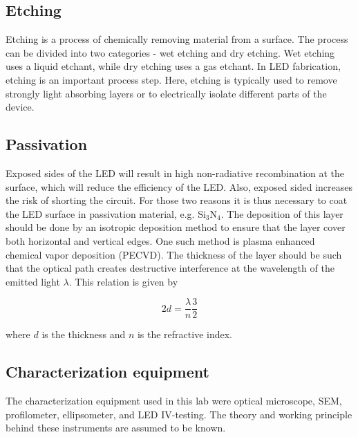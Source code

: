 \subsection{Etching}
\label{etching}

Etching is a process of chemically removing material from a surface. 
The process can be divided into two categories -  wet etching and dry etching.
Wet etching uses a liquid etchant, while dry etching uses a gas etchant.
In LED fabrication, etching is an important process step.
Here, etching is typically used to remove strongly light absorbing layers or to electrically isolate different parts of the device.

\subsection{Passivation}

Exposed sides of the LED will result in high non-radiative recombination at the surface, which will reduce the efficiency of the LED.
Also, exposed sided increases the risk of shorting the circuit.
For those two reasons it is thus necessary to coat the LED surface in passivation material, e.g. Si$_3$N$_4$.
The deposition of this layer should be done by an isotropic deposition method to ensure that the layer cover both horizontal and vertical edges.
One such method is plasma enhanced chemical vapor deposition (PECVD).
The thickness of the layer should be such that the optical path creates destructive interference at the wavelength of the emitted light $\lambda$.
This relation is given by

\begin{equation}
    \label{eq:thickness}
    2d = \frac{\lambda}{n} \frac{3}{2}
\end{equation}

where $d$ is the thickness and $n$ is the refractive index.

\subsection{Characterization equipment}
\label{characterization}

The characterization equipment used in this lab were optical microscope, SEM, profilometer, ellipsometer, and LED IV-testing.
The theory and working principle behind these instruments are assumed to be known.